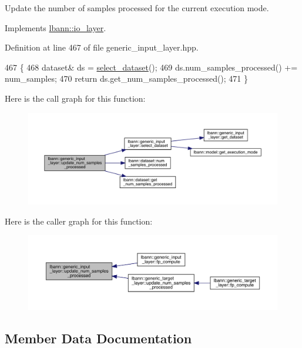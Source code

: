 Update the number of samples processed for the current execution mode. 

Implements \hyperlink{classlbann_1_1io__layer_a4ed831842ad78aaebfc9519c51268b95}{lbann\+::io\+\_\+layer}.



Definition at line 467 of file generic\+\_\+input\+\_\+layer.\+hpp.


\begin{DoxyCode}
467                                                                \{
468     dataset& ds = \hyperlink{classlbann_1_1generic__input__layer_a654365ee97a64c75a547cfb7ef329304}{select\_dataset}();
469     ds.num\_samples\_processed() += num\_samples;
470     \textcolor{keywordflow}{return} ds.get\_num\_samples\_processed();
471   \}
\end{DoxyCode}
Here is the call graph for this function\+:\nopagebreak
\begin{figure}[H]
\begin{center}
\leavevmode
\includegraphics[width=350pt]{classlbann_1_1generic__input__layer_a0c2f123432ec6af168012cc8699a1d3f_cgraph}
\end{center}
\end{figure}
Here is the caller graph for this function\+:\nopagebreak
\begin{figure}[H]
\begin{center}
\leavevmode
\includegraphics[width=350pt]{classlbann_1_1generic__input__layer_a0c2f123432ec6af168012cc8699a1d3f_icgraph}
\end{center}
\end{figure}


\subsection{Member Data Documentation}
\mbox{\label{classlbann_1_1generic__input__layer_a9dfe8b9afaebc7a5bcb0177ee2ab428f}} 
